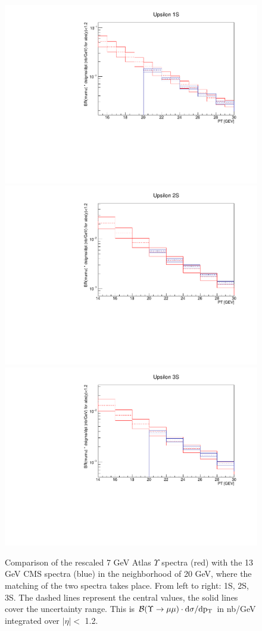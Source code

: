 \documentclass[12pt]{article}
\begin{document}
\begin{figure}
\begin{adjustwidth}{-2cm}{-2cm}
\centering
\includegraphics[width=0.32\linewidth]{../oniaDirect/upsilon/upsilon-1s-atlas-cms-comparison.pdf}
\includegraphics[width=0.32\linewidth]{../oniaDirect/upsilon/upsilon-2s-atlas-cms-comparison.pdf}
\includegraphics[width=0.32\linewidth]{../oniaDirect/upsilon/upsilon-3s-atlas-cms-comparison.pdf}
\end{adjustwidth}
\caption{\protect Comparison of the rescaled 7 GeV Atlas $\Upsilon$ spectra (red) with the
  13 GeV CMS spectra (blue) in the neighborhood of 20 GeV, where the matching of
  the two spectra takes place.  From left to right: 1S, 2S, 3S.
  The dashed lines represent the central values, the solid
  lines cover the uncertainty range.  This is ${\cal B}(\Upsilon \to \mu\mu) \cdot
  \rm{d}\sigma/\rm{d}p_T$ in nb/GeV integrated
  over $|\eta| <$ 1.2.}
\label{fig:checkMatch}
\end{figure}
\end{document}
